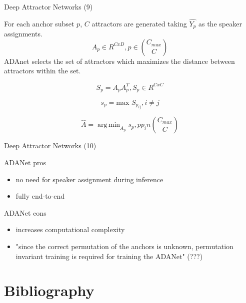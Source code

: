 \documentclass[11pt]{beamer}
\DeclareMathOperator*{\argmin}{arg\,min}
\begin{document}
\begin{frame}{Deep Attractor Networks (9)}

For each anchor subset $p$, $C$ attractors are generated taking $\hat{Y_p}$ as the speaker assignments.
\linebreak
\begin{equation}
A_p \in R^{CxD}, p \in {C_{max} \choose C}
\end{equation}
\linebreak
ADAnet selects the set of attractors which maximizes the distance between attractors within the set.

\begin{equation}
S_p = A_p A_p^T, S_p \in R^{CxC}
\end{equation}

\begin{equation}
s_p = \text{max } S_{p_{ij}}, i \neq j
\end{equation}

\begin{equation}
\hat{A} = \argmin_{A_{p}} {s_p}, p p_in {C_{max} \choose C}
\end{equation}

\end{frame}

\begin{frame}{Deep Attractor Networks (10)}

ADANet pros
\begin{itemize}
\item no need for speaker assignment during inference
\item fully end-to-end
\end{itemize}

ADANet cons
\begin{itemize}
\item increases computational complexity
\item "since the correct permutation of the anchors is unknown, permutation invariant training is required for training the ADANet" (???) 
\end{itemize}

\end{frame}




\section{Bibliography}


\end{document}
